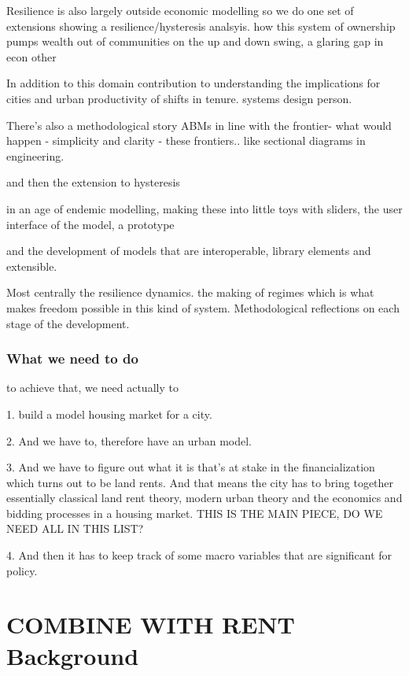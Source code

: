 Resilience is also largely outside economic modelling
so we do one set of extensions showing a resilience/hysteresis analsyis. how this system of ownership pumps wealth out of communities on the up and down swing, a glaring gap in econ other

In addition to this domain contribution to understanding the implications for cities and urban productivity of shifts in tenure. 
systems design person.

There's also a methodological story 
ABMs in line with the frontier- what would happen - simplicity and clarity - these frontiers.. like sectional diagrams in engineering. 

and then the extension to hysteresis

in an age of endemic modelling, making these into little toys with sliders, the user interface of the model, a prototype

and the development of models that are interoperable, library elements and extensible. 


Most centrally the resilience dynamics.
the making of regimes which is what makes freedom possible in this kind of system. 
Methodological reflections on each stage of the development. 




\subsection{What we need to do}
to achieve that, we need actually to 

1. build a model housing market for a city. 

2. And we have to, therefore have an urban model. 

3. And we have to figure out what it is that's at stake in the financialization which turns out to be land rents. And that means the city has to bring together essentially classical land rent theory, modern urban theory and the economics and bidding processes in a housing market. THIS IS THE MAIN PIECE, DO WE  NEED ALL IN THIS LIST?

4. And then it has to keep track of some macro variables that are significant for policy. 





\chapter{COMBINE WITH RENT Background} \label{chapter-background}

